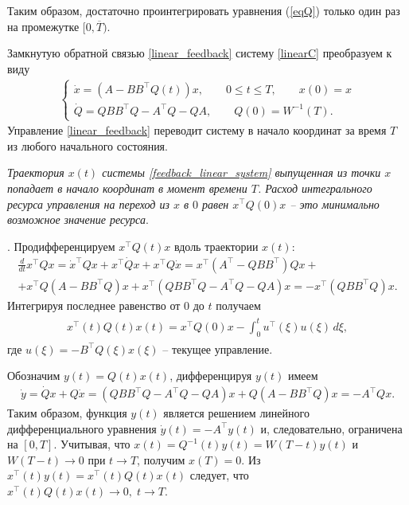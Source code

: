 \documentclass[../main.tex]{subfiles}
\begin{document}
Таким образом, достаточно проинтегрировать уравнения (\ref{eqQ}) только один раз на промежутке $[0,\overline{T})$.

Замкнутую обратной связью \eqref{linear_feedback} систему \eqref{linearC} преобразуем к виду
\begin{gather}\label{feedback_linear_system}
	\left\lbrace \begin{array}{l}
			\dot{x} = (A - B B^{\top} Q(t) ) x, \qquad 0 \leqslant t \leqslant T, \qquad x(0) = x\\
			\dot{Q} = Q B B^{\top} Q - A^{\top}Q - Q A, \qquad Q(0) = W^{-1}(T).
		\end{array} \right. 
	\end{gather}
 Управление  \eqref{linear_feedback}
	переводит систему в начало координат за время $T$ из любого начального состояния.
\begin{utv}
	{\it Траектория $x(t) $ системы {\rm \eqref{feedback_linear_system}} выпущенная из точки $ x $ попадает в начало координат в момент времени $T$. Расход интегрального ресурса управления на переход из $ x $ в $ 0 $ равен $x^{\top} Q(0) x $ -- это минимально возможное значение ресурса}.
\end{utv}
\doc. 
	Продифференцируем $x^{\top} Q(t) x$ вдоль траектории $ x(t) $:
	\begin{gather*}
		\frac{d}{dt} x^{\top} Q x = \dot{x}^{\top} Q x + x^{\top} \dot{Q} x + x^{\top} Q \dot{x} = x^{\top} (A^{\top} - Q B B^{\top} )Q x + \\ + x^{\top} Q (A - B B^{\top} Q)x + x^{\top} (Q B B^{\top} Q - A^{\top}Q - Q A) x = 
		-x^{\top} (Q B B^{\top} Q) x.
	\end{gather*}
	Интегрируя последнее равенство от $ 0 $ до $ t $ получаем
	\begin{gather}\label{xqx}
		\begin{gathered}
			x^{\top}(t) Q(t)x(t) = 
			x^{\top} Q(0)x - \int_{0}^{t} u^{\top}(\xi)  u(\xi) \, d\xi,
		\end{gathered}
	\end{gather}
где $ u(\xi) = -B^{\top} Q(\xi) x(\xi)$ -- текущее управление.

Обозначим $y(t)=Q(t)x(t)$, дифференцируя $y(t)$ имеем
\begin{gather*}
    \dot{y}=\dot{Q}x+Q\dot{x}= ( Q B B^{\top} Q - A^{\top}Q - Q A)x+Q(A - B B^{\top} Q ) x=-A^\top Q x.
\end{gather*}
Таким образом, функция $y(t)$ является решением линейного дифференциального уравнения $\dot{y}(t)=-A^\top y(t)$ и, следовательно, ограничена на $[0,T]$. Учитывая, что
$
x(t)=Q^{-1}(t)y(t)=W(T-t)y(t)$
и $W(T-t)\to 0$ при $t\to T$, получим $x(T)=0$. 
Из $x^\top(t)y(t)=x^\top(t)Q(t)x(t)$ 
следует, что $x^\top(t)Q(t)x(t) \to 0,\;t\to T $.
\end{document}
